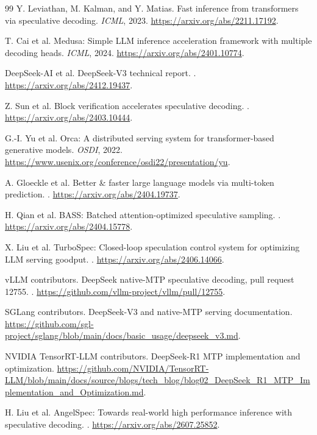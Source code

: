 \documentclass[10pt,twocolumn]{article}
\begin{document}
\begin{thebibliography}{99}
Y. Leviathan, M. Kalman, and Y. Matias.
\newblock Fast inference from transformers via speculative decoding.
\newblock \emph{ICML}, 2023. \url{https://arxiv.org/abs/2211.17192}.

T. Cai et al.
\newblock Medusa: Simple LLM inference acceleration framework with multiple
decoding heads.
\newblock \emph{ICML}, 2024. \url{https://arxiv.org/abs/2401.10774}.

DeepSeek-AI et al.
\newblock DeepSeek-V3 technical report.
. \url{https://arxiv.org/abs/2412.19437}.

Z. Sun et al.
\newblock Block verification accelerates speculative decoding.
. \url{https://arxiv.org/abs/2403.10444}.

G.-I. Yu et al.
\newblock Orca: A distributed serving system for transformer-based generative
models.
\newblock \emph{OSDI}, 2022.
\url{https://www.usenix.org/conference/osdi22/presentation/yu}.

A. Gloeckle et al.
\newblock Better \& faster large language models via multi-token prediction.
. \url{https://arxiv.org/abs/2404.19737}.

H. Qian et al.
\newblock BASS: Batched attention-optimized speculative sampling.
. \url{https://arxiv.org/abs/2404.15778}.

X. Liu et al.
\newblock TurboSpec: Closed-loop speculation control system for optimizing
LLM serving goodput.
. \url{https://arxiv.org/abs/2406.14066}.

vLLM contributors.
\newblock DeepSeek native-MTP speculative decoding, pull request 12755.
.
\url{https://github.com/vllm-project/vllm/pull/12755}.

SGLang contributors.
\newblock DeepSeek-V3 and native-MTP serving documentation.
\newblock \url{https://github.com/sgl-project/sglang/blob/main/docs/basic_usage/deepseek_v3.md}.

NVIDIA TensorRT-LLM contributors.
\newblock DeepSeek-R1 MTP implementation and optimization.
\newblock \url{https://github.com/NVIDIA/TensorRT-LLM/blob/main/docs/source/blogs/tech_blog/blog02_DeepSeek_R1_MTP_Implementation_and_Optimization.md}.

H. Liu et al.
\newblock AngelSpec: Towards real-world high performance inference with
speculative decoding.
. \url{https://arxiv.org/abs/2607.25852}.


\end{thebibliography}
\end{document}
